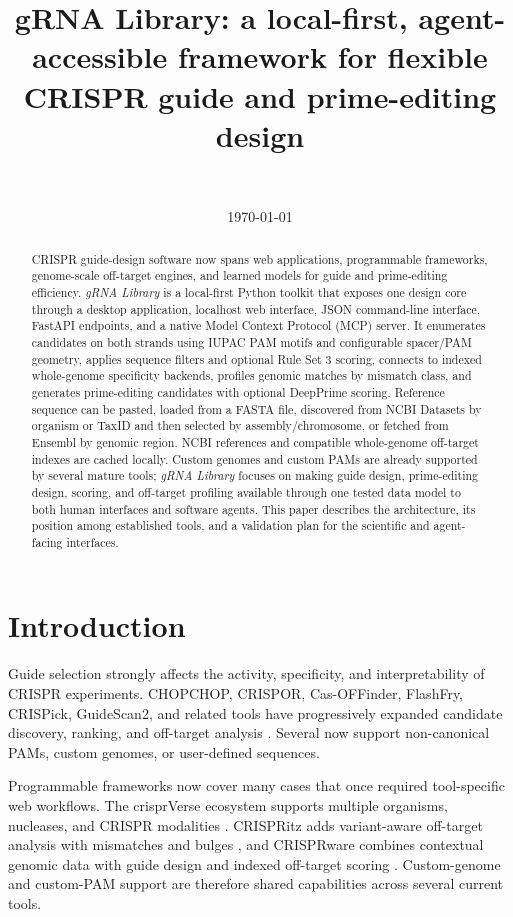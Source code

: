 \documentclass[11pt]{article}
\title{\textbf{gRNA Library: a local-first, agent-accessible framework for flexible CRISPR guide and prime-editing design}}
\author{\todo{Author names and affiliations}\\\todo{Corresponding author}}
\date{\today}
\newcommand{\grnalib}{\textit{gRNA Library}}
\begin{document}
\maketitle

\begin{abstract}
CRISPR guide-design software now spans web applications, programmable frameworks, genome-scale off-target engines, and learned models for guide and prime-editing efficiency. \grnalib{} is a local-first Python toolkit that exposes one design core through a desktop application, localhost web interface, JSON command-line interface, FastAPI endpoints, and a native Model Context Protocol (MCP) server. It enumerates candidates on both strands using IUPAC PAM motifs and configurable spacer/PAM geometry, applies sequence filters and optional Rule Set 3 scoring, connects to indexed whole-genome specificity backends, profiles genomic matches by mismatch class, and generates prime-editing candidates with optional DeepPrime scoring. Reference sequence can be pasted, loaded from a FASTA file, discovered from NCBI Datasets by organism or TaxID and then selected by assembly/chromosome, or fetched from Ensembl by genomic region. NCBI references and compatible whole-genome off-target indexes are cached locally. Custom genomes and custom PAMs are already supported by several mature tools; \grnalib{} focuses on making guide design, prime-editing design, scoring, and off-target profiling available through one tested data model to both human interfaces and software agents. This paper describes the architecture, its position among established tools, and a validation plan for the scientific and agent-facing interfaces.
\end{abstract}

\section{Introduction}

Guide selection strongly affects the activity, specificity, and interpretability of CRISPR experiments. CHOPCHOP, CRISPOR, Cas-OFFinder, FlashFry, CRISPick, GuideScan2, and related tools have progressively expanded candidate discovery, ranking, and off-target analysis \citep{labun2019chopchop,concordet2018crispor,bae2014casoffinder,mckenna2018flashfry,schmidt2025guidescan2}. Several now support non-canonical PAMs, custom genomes, or user-defined sequences.

Programmable frameworks now cover many cases that once required tool-specific web workflows. The crisprVerse ecosystem supports multiple organisms, nucleases, and CRISPR modalities \citep{hoberecht2022crisprverse}. CRISPRitz adds variant-aware off-target analysis with mismatches and bulges \citep{cancellieri2020crispritz}, and CRISPRware combines contextual genomic data with guide design and indexed off-target scoring \citep{malekos2025crisprware}. Custom-genome and custom-PAM support are therefore shared capabilities across several current tools.
\end{document}
